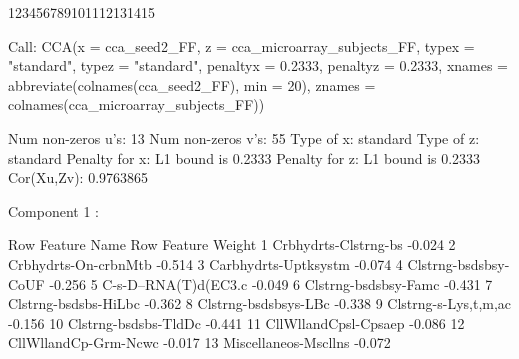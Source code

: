 \documentclass{article}\usepackage[]{graphicx}\usepackage[]{color}
\begin{document}
\begin{Schunk}
{}

\begin{Soutput}
123456789101112131415
\end{Soutput}
\begin{Soutput}
Call: CCA(x = cca_seed2_FF, z = cca_microarray_subjects_FF, typex = "standard", 
    typez = "standard", penaltyx = 0.2333, penaltyz = 0.2333, 
    xnames = abbreviate(colnames(cca_seed2_FF), min = 20), znames = colnames(cca_microarray_subjects_FF))


Num non-zeros u's:  13 
Num non-zeros v's:  55 
Type of x:  standard 
Type of z:  standard 
Penalty for x: L1 bound is  0.2333 
Penalty for z: L1 bound is  0.2333 
Cor(Xu,Zv):  0.9763865

 Component  1 :

   Row Feature Name     Row Feature Weight
1  Crbhydrts-Clstrng-bs -0.024            
2  Crbhydrts-On-crbnMtb -0.514            
3  Carbhydrts-Uptksystm -0.074            
4  Clstrng-bsdsbsy-CoUF -0.256            
5  C-s-D--RNA(T)d(EC3.c -0.049            
6  Clstrng-bsdsbsy-Famc -0.431            
7  Clstrng-bsdsbs-HiLbc -0.362            
8  Clstrng-bsdsbsys-LBc -0.338            
9  Clstrng-s-Lys,t,m,ac -0.156            
10 Clstrng-bsdsbs-TldDc -0.441            
11 CllWllandCpsl-Cpsaep -0.086            
12 CllWllandCp-Grm-Ncwc -0.017            
13 Miscellaneos-Mscllns -0.072            


\end{Soutput}
\end{Schunk}
\end{document}
